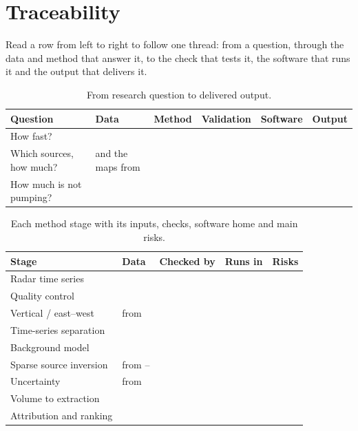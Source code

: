 \section{Traceability}\label{sec:trace}

\begin{inshort}
Read a row from left to right to follow one thread: from a question, through the data and method
that answer it, to the check that tests it, the software that runs it and the output that delivers
it.
\end{inshort}

{\small
\begin{xltabular}{\linewidth}{@{}L{21mm}L{25mm}L{25mm}L{25mm}L{22mm}Y@{}}
\caption{From research question to delivered output.}\label{tab:traceq}\\*
\toprule
\textbf{Question} & \textbf{Data} & \textbf{Method} & \textbf{Validation} & \textbf{Software} & \textbf{Output}\\*
\midrule
{} How fast? &      &     &    &    &  \\
 Which sources, how much? &   and the maps from  &     &     &     &  \\
 How much is not pumping? &     &   &  &  &  \\
\bottomrule
\end{xltabular}}

{\small
\begin{xltabular}{\linewidth}{@{}L{46mm}L{24mm}L{24mm}L{22mm}Y@{}}
\caption{Each method stage with its inputs, checks, software home and main risks.}\label{tab:tracem}\\*
\toprule
\textbf{Stage} & \textbf{Data} & \textbf{Checked by} & \textbf{Runs in} & \textbf{Risks}\\*
\midrule
{} Radar time series &    &  &   &   \\
 Quality control &   &   &  &  \\
 Vertical / east--west & from  &  &  & \\
 Time-series separation &  &  &  & \\
 Background model &    &  &  & \\
 Sparse source inversion & from -- &    &  & \\
 Uncertainty & from  &  &  & \\
 Volume to extraction &  &  &  &  \\
 Attribution and ranking &   &  &    & \\
\bottomrule
\end{xltabular}}

